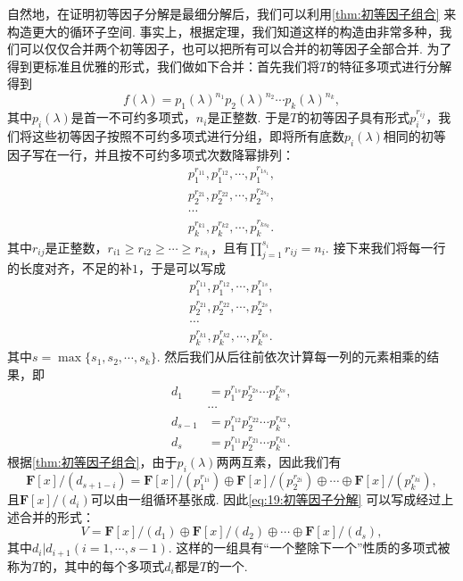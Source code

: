 自然地，在证明初等因子分解是最细分解后，我们可以利用\autoref{thm:初等因子组合} 来构造更大的循环子空间. 事实上，根据定理，我们知道这样的构造由非常多种，我们可以仅仅合并两个初等因子，也可以把所有可以合并的初等因子全部合并. 为了得到更标准且优雅的形式，我们做如下合并：首先我们将$T$的特征多项式进行分解得到
\[f(\lambda)=p_1(\lambda)^{n_1}p_2(\lambda)^{n_2}\cdots p_k(\lambda)^{n_k},\]
其中$p_i(\lambda)$是首一不可约多项式，$n_i$是正整数. 于是$T$的初等因子具有形式$p_i^{r_{ij}}$，我们将这些初等因子按照不可约多项式进行分组，即将所有底数$p_i(\lambda)$相同的初等因子写在一行，并且按不可约多项式次数降幂排列：
\begin{gather*}
    p_1^{r_{11}},p_1^{r_{12}},\cdots,p_1^{r_{1s_1}}, \\
    p_2^{r_{21}},p_2^{r_{22}},\cdots,p_2^{r_{2s_2}}, \\
    \cdots \\
    p_k^{r_{k1}},p_k^{r_{k2}},\cdots,p_k^{r_{ks_k}}.
\end{gather*}
其中$r_{ij}$是正整数，$r_{i1}\geqslant r_{i2}\geqslant\cdots\geqslant r_{is_i}$，且有$\prod\limits_{j=1}^{s_i}r_{ij}=n_i$. 接下来我们将每一行的长度对齐，不足的补$1$，于是可以写成
\begin{gather*}
    p_1^{r_{11}},p_1^{r_{12}},\cdots,p_1^{r_{1s}}, \\
    p_2^{r_{21}},p_2^{r_{22}},\cdots,p_2^{r_{2s}}, \\
    \cdots \\
    p_k^{r_{k1}},p_k^{r_{k2}},\cdots,p_k^{r_{ks}}.
\end{gather*}
其中$s=\max\{s_1,s_2,\cdots,s_k\}$. 然后我们从后往前依次计算每一列的元素相乘的结果，即
\begin{align*}
    d_1     & =p_1^{r_{1s}}p_2^{r_{2s}}\cdots p_k^{r_{ks}}, \\
            & \cdots                                        \\
    d_{s-1} & =p_1^{r_{12}}p_2^{r_{22}}\cdots p_k^{r_{k2}}, \\
    d_s     & =p_1^{r_{11}}p_2^{r_{21}}\cdots p_k^{r_{k1}}.
\end{align*}
根据\autoref{thm:初等因子组合}，由于$p_i(\lambda)$两两互素，因此我们有
\[\mathbf{F}[x]/(d_{s+1-i})=\mathbf{F}[x]/(p_1^{r_{1i}})\oplus\mathbf{F}[x]/(p_2^{r_{2i}})\oplus\cdots\oplus\mathbf{F}[x]/(p_k^{r_{ki}}),\]
且$\mathbf{F}[x]/(d_i)$可以由一组循环基张成. 因此\autoref{eq:19:初等因子分解} 可以写成经过上述合并的形式：
\begin{equation} \label{eq:20:不变因子分解}
    V=\mathbf{F}[x]/(d_1)\oplus\mathbf{F}[x]/(d_2)\oplus\cdots\oplus\mathbf{F}[x]/(d_s),
\end{equation}
其中$d_i|d_{i+1}(i=1,\cdots,s-1)$. 这样的一组具有``一个整除下一个''性质的多项式被称为$T$的，其中的每个多项式$d_i$都是$T$的一个.

